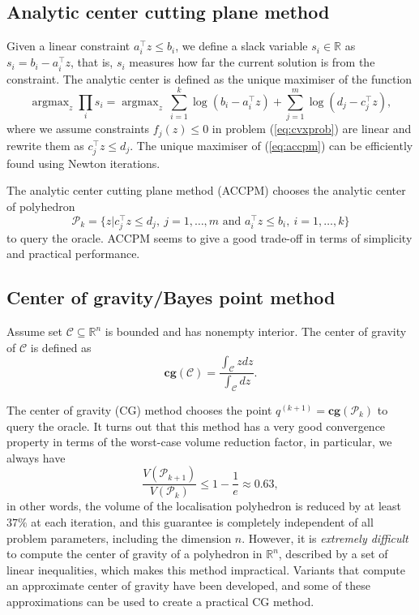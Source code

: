 \documentclass[9pt]{extarticle}
\DeclareMathOperator*{\argmax}{argmax}
\newcommand{\eat}[1]{}
\begin{document}
\subsection{Analytic center cutting plane method}
Given a linear constraint $a_i^\top z \le b_i$, we define a slack variable $s_i \in \mathbb{R}$ as $s_i = b_i - a_i^\top z$,
that is, $s_i$ measures how far the current solution is from the constraint.
The analytic center is defined as the unique maximiser of the function
\begin{equation}
\label{eq:accpm}
\argmax_z \prod_i s_i = \argmax_z ~ \sum_{i=1}^k \log(b_i - a_i^\top z) + \sum_{j=1}^m \log(d_j - c_j^\top z),
\end{equation}
where we assume constraints $f_j(z) \le 0$ in problem (\ref{eq:cvxprob}) are linear and rewrite them as $c_j^\top z \le d_j$.
The unique maximiser of (\ref{eq:accpm}) can be efficiently found using Newton iterations.

\eat{citation}

The analytic center cutting plane method (ACCPM) chooses the analytic center of polyhedron 
\begin{equation*}
\mathcal{P}_k = \{ z | c_j^\top z \le d_j, ~ j=1, \dots, m \text{~and~} a_i^\top z \le b_i, ~ i=1, \dots, k \}
\end{equation*}
to query the oracle.
ACCPM seems to give a good trade-off in terms of simplicity and practical performance.

\eat{citation}


\subsection{Center of gravity/Bayes point method}
Assume set $\mathcal{C} \subseteq \mathbb{R}^n$ is bounded and has nonempty interior. 
The center of gravity of $\mathcal{C}$ is defined as
\begin{equation}
\textbf{cg}(\mathcal{C}) = \frac{\int_\mathcal{C} z dz}{\int_\mathcal{C} dz}.
\end{equation}

The center of gravity (CG) method chooses the point $q^{(k+1)} = \textbf{cg}(\mathcal{P}_{k})$ to query the oracle.
It turns out that this method has a very good convergence property in terms of the worst-case volume reduction factor,
in particular, we always have
\begin{equation}
\frac{V(\mathcal{P}_{k+1})}{V(\mathcal{P}_{k})} \le 1 - \frac{1}{e} \approx 0.63,
\end{equation}
in other words, the volume of the localisation polyhedron is reduced by at least $37\%$ at each iteration,
and this guarantee is completely independent of all problem parameters, including the dimension $n$.
However, it is \textit{extremely difficult} to compute the center of gravity of a polyhedron in $\mathbb{R}^n$, described by a set of linear inequalities,
which makes this method impractical.
Variants that compute an approximate center of gravity have been developed, and some of these approximations can be used to create a practical CG method.
\end{document}
